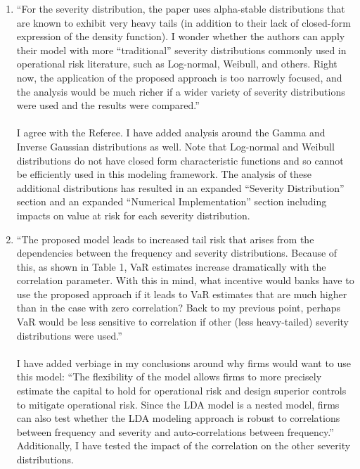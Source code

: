 \documentclass{article}
\theoremstyle{definition}
\begin{document}
\begin{enumerate}
\item 
``For the severity distribution, the paper uses alpha-stable distributions that are known to exhibit very heavy tails (in addition to their lack of closed-form expression of the density function). I wonder whether the authors can apply their model with more “traditional” severity distributions commonly used in operational risk literature, such as Log-normal, Weibull, and others. Right now, the application of the proposed approach is too narrowly focused, and the analysis would be much richer if a wider variety of severity distributions were used and the results were compared.''
\\
\\
I agree with the Referee.  I have added analysis around the Gamma and Inverse Gaussian distributions as well.  Note that Log-normal and Weibull distributions do not have closed form characteristic functions and so cannot be efficiently used in this modeling framework.  The analysis of these additional distributions has resulted in an expanded ``Severity Distribution'' section and an expanded ``Numerical Implementation'' section including impacts on value at risk for each severity distribution.

\item
``The proposed model leads to increased tail risk that arises from the dependencies between the frequency and severity distributions. Because of this, as shown in Table 1, VaR estimates increase dramatically with the correlation parameter. With this in mind, what incentive would banks have to use the proposed approach if it leads to VaR estimates that are much higher than in the case with zero correlation? Back to my previous point, perhaps VaR would be less sensitive to correlation if other (less heavy-tailed) severity distributions were used.''
\\
\\
I have added verbiage in my conclusions around why firms would want to use this model: ``The
flexibility  of  the  model  allows  firms  to  more  precisely  estimate  the  capital  to hold  for  operational  risk  and  design  superior  controls  to  mitigate  operational risk.   Since  the  LDA  model  is  a  nested  model,  firms  can  also  test  whether the  LDA  modeling  approach  is  robust  to  correlations  between  frequency  and severity and auto-correlations between frequency.''  Additionally, I have tested the impact of the correlation on the other severity distributions.


\end{enumerate}
\end{document}

